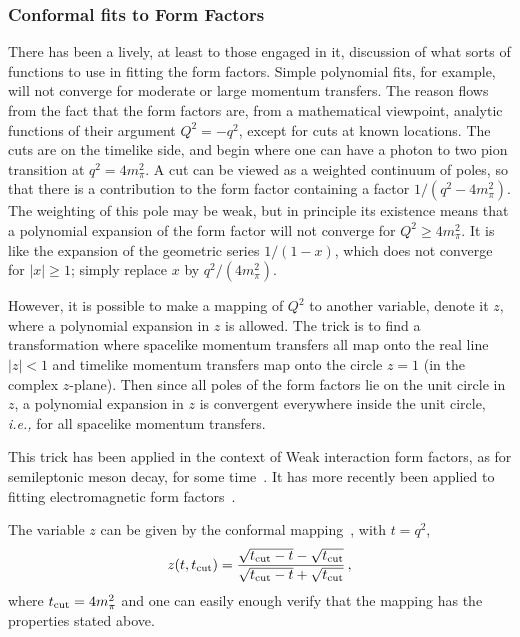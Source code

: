 %
\subsubsection{Conformal fits to Form Factors}
\label{subsubsec:cf}

There has been a lively, at least to those engaged in it, discussion of what sorts of functions to use in fitting the form factors.  Simple polynomial fits, for example,  will not converge for moderate or large momentum transfers.   The reason flows from the fact that the form factors are, from a mathematical viewpoint, analytic functions of their argument $Q^2 = -q^2$, except for cuts at known locations.  The cuts are on the timelike side, and begin where one can have a photon to two pion transition at $q^2 = 4 m_\pi^2$.  A cut can be viewed as a weighted continuum of poles, so that there is a contribution to the form factor containing a factor $1/(q^2 - 4 m_\pi^2)$.  The weighting of this pole may be weak, but in principle its existence means that a polynomial expansion of the form factor will not converge for $Q^2 \ge 4 m_\pi^2$.  It is like the expansion of the geometric series $1/(1-x)$, which does not converge for $|x| \ge 1$;  simply replace $x$ by $q^2/(4m_\pi^2)$.

However, it is possible to make a mapping of $Q^2$ to another variable, denote it $z$, where a polynomial expansion in $z$ is allowed.  The trick is to find a transformation where spacelike momentum transfers all map onto the real line $|z| < 1$ and timelike momentum transfers map onto the circle $z =1$ (in the complex $z$-plane).  Then since all poles of the form factors lie on the unit circle in $z$, a polynomial expansion in $z$ is convergent everywhere inside the unit circle, \textit{i.e.,} for all spacelike momentum transfers.

This trick has been applied in the context of Weak interaction form factors, as for semileptonic meson decay, for some time~\cite{Boyd:1995sq,Bourrely:2008za}.  It has more recently been applied to fitting electromagnetic form factors~\cite{Hill:2010yb,Lorenz:2014vha}.

The variable $z$ can be given by the conformal mapping~\cite{Hill:2010yb,Lorenz:2014vha}, with $t = q^2$,
\begin{equation}
z(t,t_{\rm cut}) = \frac{ \sqrt{t_{\rm cut} - t} - \sqrt{t_{\rm cut}}}
					{ \sqrt{t_{\rm cut} - t} + \sqrt{t_{\rm cut}}}	\,,
\end{equation}
where $t_{\rm cut} = 4 m_\pi^2$ and one can easily enough verify that the mapping has the properties stated above.

